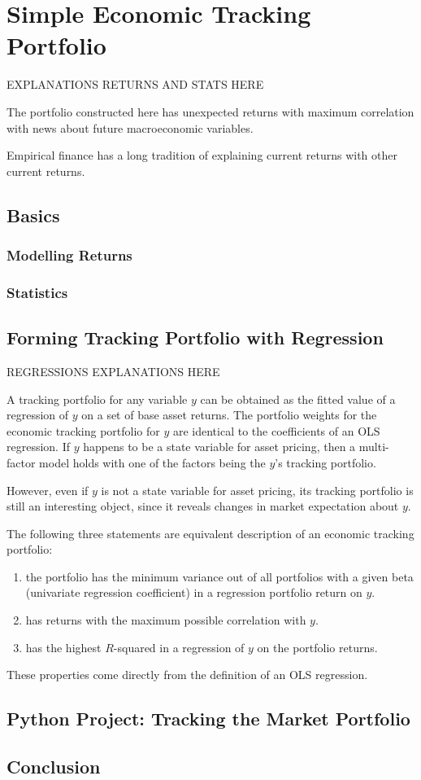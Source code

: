 \chapter{Simple Economic Tracking Portfolio}


EXPLANATIONS RETURNS AND STATS HERE

The portfolio constructed 
here has unexpected returns with maximum correlation 
with news about future macroeconomic variables.

Empirical finance has a long tradition of explaining 
current returns with other current returns. 

\section{Basics}

\subsection{Modelling Returns}

\subsection{Statistics}

\section{Forming Tracking Portfolio with Regression}


REGRESSIONS EXPLANATIONS HERE

A tracking portfolio for any variable $y$ can be obtained 
as the fitted value of a regression of $y$ on a set of 
base asset returns. The portfolio weights for the economic 
tracking portfolio for $y$ are identical to the coefficients of 
an OLS regression. If $y$ happens to be a state variable 
for asset pricing, then a multi-factor model holds with 
one of the factors being the $y$'s tracking portfolio.

However, even if $y$ is not a state variable for asset pricing, 
its tracking portfolio is still an interesting object, since 
it reveals changes in market expectation about $y$.

The following three statements are equivalent description 
of an economic tracking portfolio: 
\begin{enumerate}
    \item the portfolio has the minimum variance out 
    of all portfolios with a given beta (univariate regression coefficient)
    in a regression portfolio return on $y$.
    \item has returns with the maximum possible correlation 
    with $y$.
    \item has the highest $R$-squared in a regression of
    $y$ on the portfolio returns.
\end{enumerate}

These properties come directly from the definition of an 
OLS regression. 

\section{Python Project: Tracking the Market Portfolio}

\section{Conclusion}